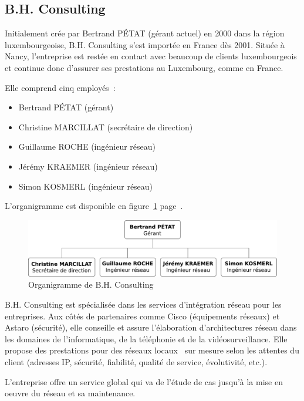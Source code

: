 \subsection{B.H. Consulting}

Initialement crée par Bertrand PÉTAT (gérant actuel) en 2000 dans la région luxembourgeoise, B.H. Consulting s'est importée en France dès 2001. Située à Nancy, l'entreprise est restée en contact avec beaucoup de clients luxembourgeois et continue donc d'assurer ses prestations au Luxembourg, comme en France.

Elle comprend cinq employés~:

\begin{itemize}
\item Bertrand PÉTAT (gérant)
\item Christine MARCILLAT (secrétaire de direction)
\item Guillaume ROCHE (ingénieur réseau)
\item Jérémy KRAEMER (ingénieur réseau)
\item Simon KOSMERL (ingénieur réseau)
\end{itemize}

L'organigramme est disponible en figure~\ref{organigramme} page~\pageref{organigramme}.

\begin{figure}[!h]
	\begin{center}
		\includegraphics[width=\textwidth]{img/organigramme.pdf}
	\end{center}
	\caption{Organigramme de B.H. Consulting}
	\label{organigramme}
\end{figure}

B.H. Consulting est spécialisée dans les services d'intégration réseau pour les entreprises. Aux côtés de partenaires comme Cisco (équipements réseaux) et Astaro (sécurité), elle conseille et assure l'élaboration d'architectures réseau dans les domaines de l'informatique, de la téléphonie et de la vidéosurveillance. Elle propose des prestations pour des réseaux locaux \og~sur mesure\fg{} selon les attentes du client (adresses IP, sécurité, fiabilité, qualité de service, évolutivité, etc.).

L’entreprise offre un service global qui va de l’étude de cas jusqu’à la mise en oeuvre du réseau et sa maintenance.

